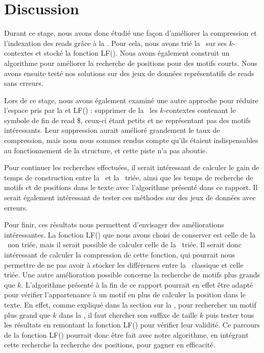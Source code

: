 \section*{Discussion}

Durant ce stage, nous avons donc étudié une façon d'améliorer la compression et l'indexation des reads grâce à la \kbwt. Pour cela, nous avons trié la \kbwt\ sur ses $k$-contextes et stocké la fonction LF(). Nous avons également construit un algorithme pour améliorer la recherche de positions pour des motifs courts. Nous avons ensuite testé nos solutions sur des jeux de données représentatifs de reads sans erreurs.

Lors de ce stage, nous avons également examiné une autre approche pour réduire l'espace pris par la \kbwt et LF() : supprimer de la \kbwt\ les $k$-contextes contenant le symbole de fin de read \$, ceux-ci étant petits et ne représentant pas des motifs intéressants. Leur suppression aurait amélioré grandement le taux de compression, mais nous nous sommes rendus compte qu'ils étaient indispensables au fonctionnement de la structure, et cette piste n'a pas aboutie.

Pour continuer les recherches effectuées, il serait intéressant de calculer le gain de temps de construction entre la \bwt\ et la \kbwt\ triée, ainsi que les temps de recherche de motifs et de positions dans le texte avec l'algorithme présenté dans ce rapport. Il serait également intéressant de tester ces méthodes sur des jeux de données avec erreurs.

Pour finir, ces résultats nous permettent d'envisager des améliorations intéressantes. La fonction LF() que nous avons choisi de conserver est celle de la \kbwt\ non triée, mais il serait possible de calculer celle de la \kbwt\ triée. Il serait donc intéressant de calculer la compression de cette fonction, qui pourrait nous permettre de ne pas avoir à stocker les différences entre la \kbwt\ classique et celle triée. Une autre amélioration possible concerne la recherche de motifs plus grands que $k$. L'algorithme présenté à la fin de ce rapport pourrait en effet être adapté pour vérifier l'appartenance à un motif en plus de calculer la position dans le texte. En effet, comme expliqué dans la section sur la \kbwt, pour rechercher un motif plus grand que $k$ dans la \kbwt, il faut chercher son suffixe de taille $k$ puis tester tous les résultats en remontant la fonction LF() pour vérifier leur validité. Ce parcours de la fonction LF() pourrait donc être fait avec notre algorithme, en intégrant cette recherche la recherche des positions, pour gagner en efficacité.

